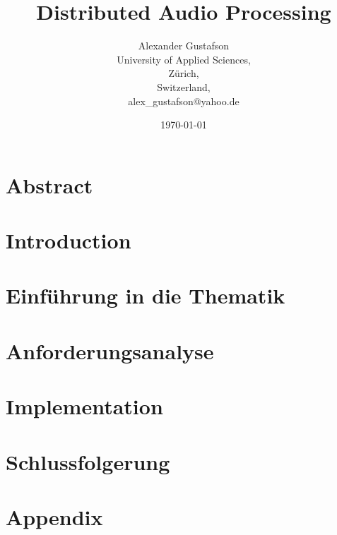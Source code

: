 \documentclass{report}
\begin{document}
\title{Distributed Audio Processing}
\author{Alexander Gustafson\\
  University of Applied Sciences,\\
  Zürich,\\
  Switzerland,\\
  alex\_gustafson@yahoo.de}
\date{\today}
\maketitle

\chapter*{Abstract}



\tableofcontents

\chapter{Introduction}



\chapter{Einführung in die Thematik}






\chapter{Anforderungsanalyse}







\chapter{Implementation}













\chapter{Schlussfolgerung }



{}


\chapter{Appendix}


\end{document}
